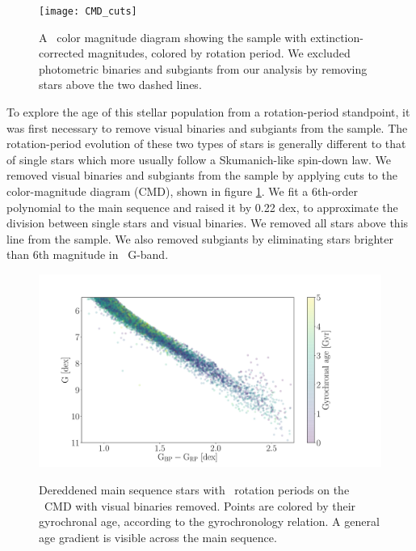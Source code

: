 \begin{figure}
  \caption{
A \gaia\ color magnitude diagram showing the \citet{mcquillan2014} sample with
    extinction-corrected magnitudes, colored by rotation period.
We excluded photometric binaries and subgiants from our analysis by removing
stars above the two dashed lines.
}
  \centering
    \texttt{[image: CMD\_cuts]}
\label{fig:CMD_cuts}
\end{figure}
To explore the age of this stellar population from a rotation-period
standpoint, it was first necessary to remove visual binaries and subgiants
from the sample.
The rotation-period evolution of these two types of stars is generally
different to that of single stars which more usually follow a Skumanich-like
spin-down law.
We removed visual binaries and subgiants from the sample by applying cuts to
the color-magnitude diagram (CMD), shown in figure \ref{fig:CMD_cuts}.
We fit a 6th-order polynomial to the main sequence and raised it by 0.22 dex,
to approximate the division between single stars and visual binaries.
We removed all stars above this line from the sample.
We also removed subgiants by eliminating stars brighter than 6th magnitude in
\gaia\ G-band.
\begin{figure}
  \caption{
Dereddened main sequence stars with \mct\ rotation periods on the \gaia\ CMD
    with visual binaries removed.  Points are colored by their gyrochronal
    age, according to the
    \citet{angus2019} gyrochronology relation.
    A general age gradient is visible across the main sequence.
}
  \centering
    \includegraphics[width=1\textwidth]{age_gradient}
\label{fig:age_gradient}
\end{figure}

